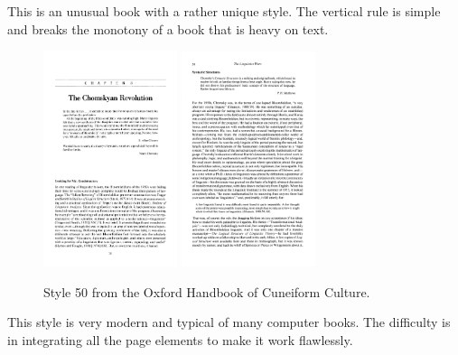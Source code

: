 This is an unusual book with a rather unique style. The vertical rule is simple and breaks the monotony of a book that is heavy on text.
\begin{figure}[ht]
\centering
\includegraphics[width=0.35\textwidth]{./chapters/chapter52.png}
\includegraphics[width=0.35\textwidth]{./chapters/chapter52a.png}
\caption{Style 50 from the Oxford Handbook of Cuneiform Culture.}
\end{figure}

This style is very modern and typical of many computer books. The difficulty is in integrating all the page elements to make it work flawlessly.

